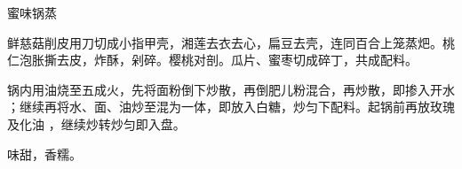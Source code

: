 \begin{recipe}[八宝锅蒸]{蜜味锅蒸}

\ingredients


\preparation

\step 鲜慈菇削皮用刀切成小指甲壳，湘莲去衣去心，扁豆去壳，连同百合上笼蒸𤆵。桃
仁泡胀撕去皮，炸酥，剁碎。樱桃对剖。瓜片、蜜枣切成碎丁，共成配料。

\step 锅内用油烧至五成火，先将面粉倒下炒散，再倒肥儿粉混合，再炒散，即掺入开水
；继续再将水、面、油炒至混为一体，即放入白糖，炒匀下配料。起锅前再放玫瑰及化油
，继续炒转炒匀即入盘。

\features

味甜，香糯。

\end{recipe}

